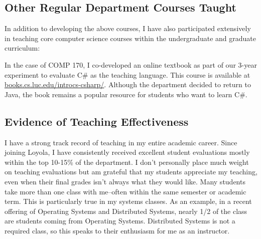 \vspace{5pt}


\subsection{Other Regular Department Courses Taught}

In addition to developing the above courses, I have also participated extensively in teaching core computer science courses within the undergraduate and graduate curriculum:


In the case of COMP 170, I co-developed an online textbook as part of our 3-year experiment to evaluate C\# as the teaching language. This course is available at \href{http://books.cs.luc.edu/introcs-csharp/}{books.cs.luc.edu/introcs-csharp/}. Although the department decided to return to Java, the book remains a popular resource for students who want to learn C\#.

\subsection{Evidence of Teaching Effectiveness}

I have a strong track record of teaching in my entire academic career. Since joining Loyola, I have consistently received excellent student evaluations mostly within the top 10-15\% of the department. I don't personally place much weight on teaching evaluations but am grateful that my students appreciate my teaching, even when their final grades isn't always what they would like. Many students take more than one class with me--often within the same semester or academic term. This is particularly true in my systems classes. As an example, in a recent offering of Operating Systems and Distributed Systems, nearly 1/2 of the class are students coming from Operating Systems. Distributed Systems is not a required class, so this speaks to their enthusiasm for me as an instructor. 
\vspace{5pt}

